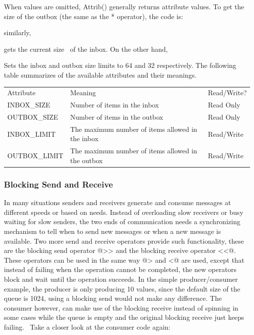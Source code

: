 
When values are omitted, \textsf{Attrib()} generally
returns attribute values. To get the size of the outbox (the same as
the * operator), the code is:


\noindent similarly, 


gets the current size \ of the inbox. On the other hand, 


Sets the inbox and outbox size limits to 64 and 32 respectively. The
following table summarizes of the available attributes and their
meanings.


\bigskip

\begin{flushleft}
\tablehead{}
\begin{supertabular}{m{2.0941598in}m{1.9087598in}m{1.9108598in}}
Attribute &
Meaning &
Read/Write?\\
INBOX\_SIZE &
Number of items in the inbox &
Read Only\\
OUTBOX\_SIZE &
Number of items in the outbox &
Read Only\\
INBOX\_LIMIT &
The maximum number of items allowed in the inbox &
Read/Write\\
OUTBOX\_LIMIT &
The maximum number of items allowed in the outbox &
Read/Write\\
\end{supertabular}
\end{flushleft}

\bigskip


\bigskip

\subsubsection{Blocking Send and Receive}

In many situations senders and receivers generate and consume messages
at different speeds or based on needs. Instead of overloading slow
receivers or busy waiting for slow senders, the two ends of
communication needs a synchronizing mechanism to tell when to send new
messages or when a new message is available. Two more send and receive
operators provide such functionality, these are the blocking send
operator \textsf{@{\textgreater}{\textgreater}} and the
blocking receive operator
\textsf{{\textless}{\textless}@.} These operators can
be used in the same way \textsf{@{\textgreater}} and
\textsf{{\textless}@} are used, except that instead of
failing when the operation cannot be completed, the new operators block
and wait until the operation succeeds. In the simple producer/consumer
example, the producer is only producing 10 values, since the default
size of the queue is 1024, using a blocking send would not make any
difference. The consumer however, can make use of the blocking receive
instead of spinning in some cases while the queue is empty and the
original blocking receive just keeps failing. \ Take a closer look at
the consumer code again:

